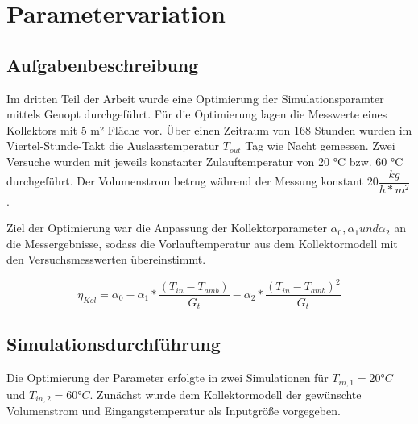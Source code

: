 \section{Parametervariation	}
\subsection{Aufgabenbeschreibung}

Im dritten Teil der Arbeit wurde eine Optimierung der Simulationsparamter mittels Genopt durchgeführt. Für die Optimierung lagen die Messwerte eines Kollektors mit 5 m² Fläche vor. Über einen Zeitraum von 168 Stunden wurden im Viertel-Stunde-Takt die Auslasstemperatur $T_{out}$ Tag wie Nacht gemessen. Zwei Versuche wurden mit jeweils konstanter Zulauftemperatur von 20 °C bzw. 60 °C durchgeführt. Der Volumenstrom betrug während der Messung konstant $20\dfrac{kg}{h*m^2}$.

Ziel der Optimierung war die Anpassung der Kollektorparameter  $\alpha_{0}, \alpha_{1} und \alpha_{2}$ an die Messergebnisse, sodass die Vorlauftemperatur aus dem Kollektormodell mit den Versuchsmesswerten übereinstimmt. 

\begin{equation}
	\label{eq:\eta}
	\eta_{Kol} = \alpha_{0}-\alpha_{1}*\frac{(T_{in}-T_{amb})}{G_{t}}-\alpha_{2}*\frac{(T_{in}-T_{amb})^2}{G_{t}}
\end{equation}

\subsection{Simulationsdurchführung}

Die Optimierung der Parameter erfolgte in zwei Simulationen für $T_{in,1} = 20 °C$ und $T_{in,2} = 60 °C$. Zunächst wurde dem Kollektormodell der gewünschte Volumenstrom und Eingangstemperatur als Inputgröße vorgegeben.  